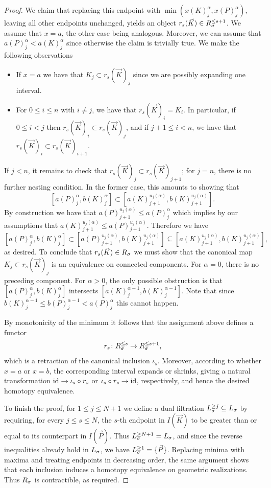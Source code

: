 \documentclass[a4paper,reqno,twoside]{amsart}
\begin{document}
\begin{proof}
We claim that replacing this endpoint with $\min(x(K)_j^\alpha,x(P)_j^\alpha)$, leaving all other endpoints unchanged, yields an object $r_s(\vec{K})\in\relax{R}_\sigma^{\leq s+1}$. We assume that $x=a$, the other case being analogous. Moreover, we can assume that $a(P)_j^\alpha < a(K)_j^\alpha$ since otherwise the claim is trivially true. We make the following observations
\begin{itemize}
	\item If $x=a$ we have that $K_j \subset r_s(\vec{K})_j$ since we are possibly expanding one interval.
	\item For $0\leq i\leq n$ with $i \neq j$, we have that $r_s(\vec K)_i=K_i$. In particular, if $0\leq i<j$ then $r_s(\vec K)_i \subset r_s(\vec K)_j$, and if $j+1\leq i<n$, we have that $r_s(\vec K)_i \subset r_s(\vec K)_{i+1}$.
\end{itemize} 
If $j<n$, it remains to check that $r_s(\vec{K})_j \subset r_s(\vec{K})_{j+1}$; for $j=n$, there is no further nesting condition. In the former case, this amounts to showing that
\[
	[a(P)_j^\alpha,b(K)_j^{\alpha}] \subset [a(K)_{j+1}^{u_j(\alpha)},b(K)_{j+1}^{u_j(\alpha)}].
\]
By construction we have that $a(P)_{j+1}^{u_j(\alpha)} \leq a(P)_{j}^{\alpha}$ which implies by our assumptions that $ a(K)_{j+1}^{u_j(\alpha)} \leq  a(P)_{j+1}^{u_j(\alpha)}$. Therefore we have
\[
	[a(P)_{j}^{\alpha},b(K)_j^{\alpha}]\subset [a(P)_{j+1}^{u_j(\alpha)},b(K)_{j+1}^{u_j(\alpha)}]\subseteq [a(K)_{j+1}^{u_j(\alpha)},b(K)_{j+1}^{u_j(\alpha)}],
\]
as desired. To conclude that $r_s(\vec{K})\in \relax{R}_\sigma$ we must show that the canonical map $K_j \subset r_s(\vec{K})_j$ is an equivalence on connected components. For $\alpha=0$, there is no preceding component. For $\alpha>0$, the only possible obstruction is that $[a(P)_{j}^{\alpha},b(K)_j^{\alpha}]$ intersects $[a(K)_j^{\alpha-1},b(K)_j^{\alpha-1}]$. Note that since $b(K)_{j}^{\alpha-1} \leq b(P)_{j}^{\alpha-1}<a(P)_{j}^{\alpha}$ this cannot happen.

 By monotonicity of the minimum it follows that the assignment above defines a functor
\[
	r_{s}\colon \relax{R}_{\sigma}^{\leq s}  \to \relax{R}_{\sigma}^{\leq s+1},
\]
which is a retraction of the canonical inclusion $\iota_s$. Moreover, according to whether $x=a$ or $x=b$, the corresponding interval expands or shrinks, giving a natural transformation $\mathrm{id}\to\iota_s\circ r_s$ or $\iota_s\circ r_s\to\mathrm{id}$, respectively, and hence the desired homotopy equivalence.

To finish the proof, for $1\leq j\leq N+1$ we define a dual filtration $\relax{L}_\sigma^{\geq j}\subseteq\relax{L}_\sigma$ by requiring, for every $j\leq s\leq N$, the $s$-th endpoint in $I(\vec K)$ to be greater than or equal to its counterpart in $I(\vec P)$. Thus $\relax{L}_\sigma^{\geq N+1}=\relax{L}_\sigma$, and since the reverse inequalities already hold in $\relax{L}_\sigma$, we have $\relax{L}_\sigma^{\geq1}=\{\vec P\}$. Replacing minima with maxima and treating endpoints in decreasing order, the same argument shows that each inclusion induces a homotopy equivalence on geometric realizations. Thus $\relax{R}_\sigma$ is contractible, as required.
\end{proof}
\medskip
\end{document}
